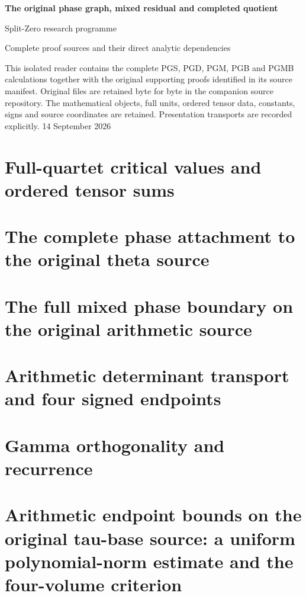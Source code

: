 \documentclass[11pt,a4paper,oneside,openany]{book}
\theoremstyle{definition}
\begin{document}
\begin{titlepage}
\vspace*{18mm}
{\Huge\bfseries The original phase graph, mixed residual and completed quotient\par}
\vspace{12mm}
{\Large Split-Zero research programme\par}
\vspace{8mm}
{\large Complete proof sources and their direct analytic dependencies\par}
\vfill
This isolated reader contains the complete PGS, PGD, PGM, PGB and PGMB calculations together with the original supporting proofs identified in its source manifest. Original files are retained byte for byte in the companion source repository. The mathematical objects, full units, ordered tensor data, constants, signs and source coordinates are retained. Presentation transports are recorded explicitly.
\vspace{8mm}
14 September 2026
\end{titlepage}
\tableofcontents
\chapter{Full-quartet critical values and ordered tensor sums}
\begingroup

\endgroup
\chapter{The complete phase attachment to the original theta source}
\begingroup

\endgroup
\chapter{The full mixed phase boundary on the original arithmetic source}
\begingroup

\endgroup
\chapter{Arithmetic determinant transport and four signed endpoints}
\begingroup

\endgroup
\chapter{Gamma orthogonality and recurrence}
\begingroup

\endgroup
\chapter{Arithmetic endpoint bounds on the original tau-base source: a uniform polynomial-norm estimate and the four-volume criterion}
\begingroup

\endgroup
\end{document}
